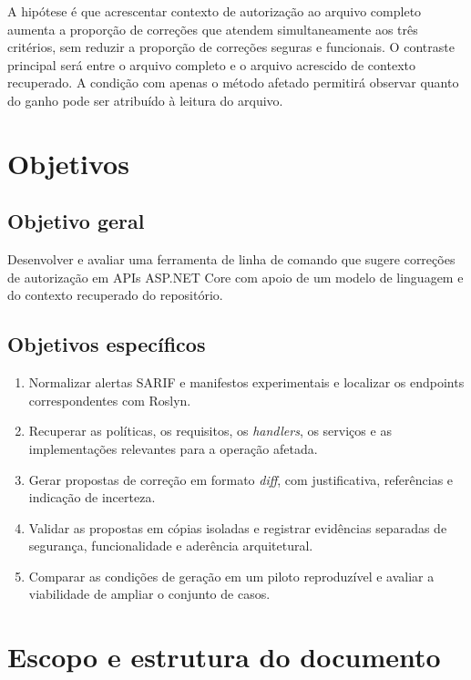 A hipótese é que acrescentar contexto de autorização ao arquivo completo aumenta a proporção de correções que atendem simultaneamente aos três critérios, sem reduzir a proporção de correções seguras e funcionais. O contraste principal será entre o arquivo completo e o arquivo acrescido de contexto recuperado. A condição com apenas o método afetado permitirá observar quanto do ganho pode ser atribuído à leitura do arquivo.

\section{Objetivos}

\subsection{Objetivo geral}

Desenvolver e avaliar uma ferramenta de linha de comando que sugere correções de autorização em APIs ASP.NET Core com apoio de um modelo de linguagem e do contexto recuperado do repositório.

\subsection{Objetivos específicos}

\begin{enumerate}
    \item Normalizar alertas SARIF e manifestos experimentais e localizar os endpoints correspondentes com Roslyn.
    \item Recuperar as políticas, os requisitos, os \textit{handlers}, os serviços e as implementações relevantes para a operação afetada.
    \item Gerar propostas de correção em formato \textit{diff}, com justificativa, referências e indicação de incerteza.
    \item Validar as propostas em cópias isoladas e registrar evidências separadas de segurança, funcionalidade e aderência arquitetural.
    \item Comparar as condições de geração em um piloto reproduzível e avaliar a viabilidade de ampliar o conjunto de casos.
\end{enumerate}

\section{Escopo e estrutura do documento}

